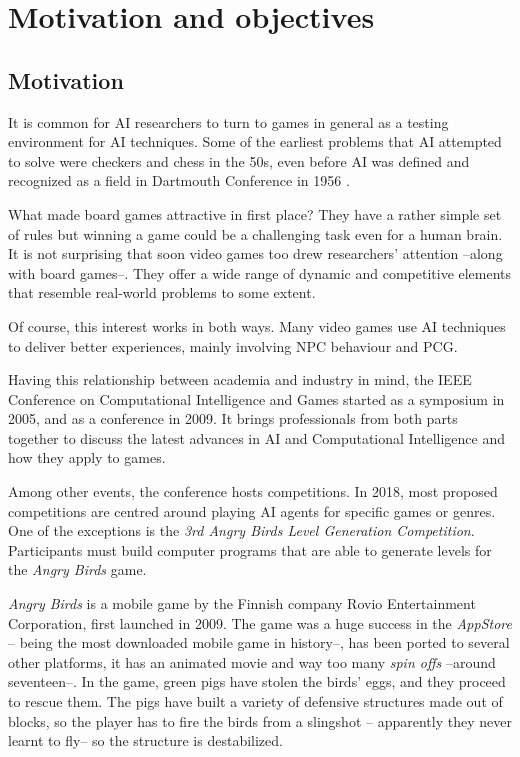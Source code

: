 \chapter{Motivation and objectives}\label{ch:introduction}
\section{Motivation}
It is common for AI researchers to turn to games in general as a testing environment for AI techniques. Some of the earliest problems that AI attempted to solve were checkers and chess in the 50s, even before AI was defined and recognized as a field in Dartmouth Conference in 1956 \cite{nilsson1998artificial}. 

What made board games attractive in first place? They have a rather simple set of rules but winning a game could be a challenging task even for a human brain. It is not surprising that soon video games too drew researchers' attention --along with board games--. They offer a wide range of dynamic and competitive elements that resemble real-world problems to some extent.

Of course, this interest works in both ways. Many video games use AI techniques to deliver better experiences, mainly involving \acf{NPC} behaviour and \acf{PCG}.

Having this relationship between academia and industry in mind, the IEEE Conference on Computational Intelligence and Games started as a symposium in 2005, and as a conference in 2009. It brings professionals from both parts together to discuss the latest advances in AI and Computational Intelligence and how they apply to games.\cite{ieee-cig}

Among other events, the conference hosts competitions. In 2018, most proposed competitions are centred around playing AI agents for specific games or genres. One of the exceptions is the \textit{3rd Angry Birds Level Generation Competition}. Participants must build computer programs that are able to generate levels for the\textit{ Angry Birds} game.

\textit{Angry Birds} is a mobile game by the Finnish company Rovio Entertainment Corporation\cite{angry-birds}, first launched in 2009. The game was a huge success in the \textit{AppStore} -- being the most downloaded mobile game in history--, has been ported to several other platforms, it has an animated movie and way too many \textit{spin offs} --around seventeen--. In the game, green pigs have stolen the birds' eggs, and they proceed to rescue them. The pigs have built a variety of defensive structures made out of blocks, so the player has to fire the birds from a slingshot -- apparently they never learnt to fly-- so the structure is destabilized.

